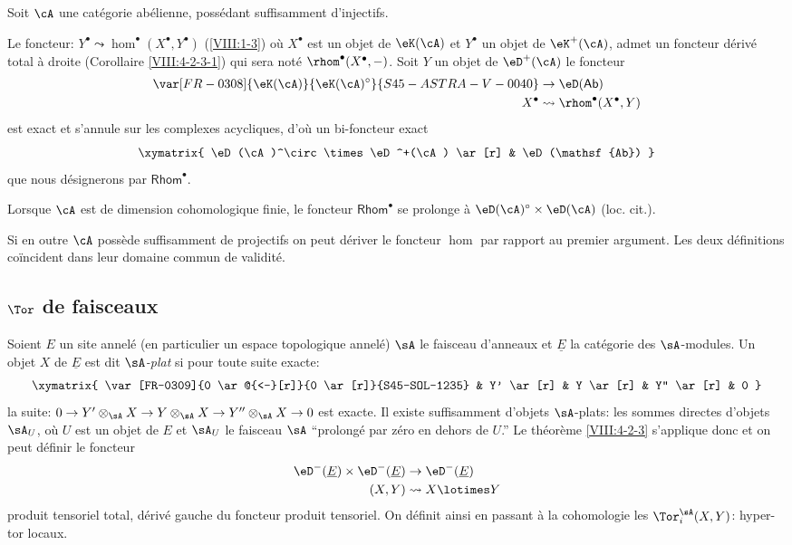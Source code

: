 Soit $\cA$ une catégorie abélienne, possédant suffisamment d'injectifs. 

Le foncteur: $Y^\bullet\leadsto \hom^\bullet(X^\bullet,Y^\bullet)$ (\ref{VIII:1-3}) 
où $X^\bullet$ est un objet de $\eK(\cA)$ et $Y^\bullet$ un objet de 
$\eK^+(\cA)$, admet un foncteur dérivé total à droite 
(Corollaire \ref{VIII:4-2-3-1}) qui sera noté $\rhom^\bullet(X^\bullet,-)$.  
Soit $Y$ un objet de $\eD^+(\cA)$ le foncteur 
\begin{align*}
  \var[FR-0308]{\eK(\cA)}{\eK(\cA)^\circ}{S45-ASTRA-V-0040} &\to \eD(\mathsf{Ab}) \\
  X^\bullet &\leadsto \rhom^\bullet(X^\bullet,Y) 
\end{align*}
est exact et s'annule sur les complexes acycliques, d'où un bi-foncteur 
exact 
\[\xymatrix{
  \eD(\cA)^\circ \times \eD^+(\cA) \ar[r] 
    & \eD(\mathsf{Ab}) 
}\]
que nous désignerons par $\mathsf{Rhom}^\bullet$. 

Lorsque $\cA$ est de dimension cohomologique finie, le foncteur 
$\mathsf{Rhom}^\bullet$ se prolonge à $\eD(\cA)^\circ\times \eD(\cA)$ 
(loc. cit.). 

Si en outre $\cA$ possède suffisamment de projectifs on peut dériver le 
foncteur $\hom$ par rapport au premier argument. Les deux définitions 
co\"incident dans leur domaine commun de validité. 










\subsection{\texorpdfstring{$\Tor$}{Tor} de faisceaux}\label{VIII:6-2}

Soient $E$ un site annelé (en particulier un espace topologique annelé) 
$\sA$ le faisceau d'anneaux et $\underline E$ la catégorie des 
$\sA$-modules. Un objet $X$ de $\underline E$ est dit 
\emph{$\sA$-plat} si pour toute suite exacte: 
\[\xymatrix{
  \var[FR-0309]{0 \ar@{<-}[r]}{0 \ar[r]}{S45-SOL-1235} 
    & Y' \ar[r] 
    & Y \ar[r] 
    & Y'' \ar[r] 
    & 0 
}\]
la suite: $0 \to Y'\otimes_\sA X \to Y\otimes_\sA X \to Y''\otimes_\sA X\to 0$ 
est exacte. Il existe suffisamment d'objets $\sA$-plats: les sommes directes 
d'objets $\sA_U$, où $U$ est un objet de $E$ et $\sA_U$ le faisceau 
$\sA$ ``prolongé par zéro en dehors de $U$.'' Le théorème 
\ref{VIII:4-2-3} s'applique donc et on peut définir le foncteur 
\begin{align*}
  \eD^-(\underline E) \times \eD^-(\underline E) &\to \eD^-(\underline E) \\
  (X,Y) &\leadsto X\lotimes Y 
\end{align*}
produit tensoriel total, dérivé gauche du foncteur produit tensoriel. 
On définit ainsi en passant à la cohomologie les $\Tor_i^\sA(X,Y)$: 
hyper-tor locaux. 

